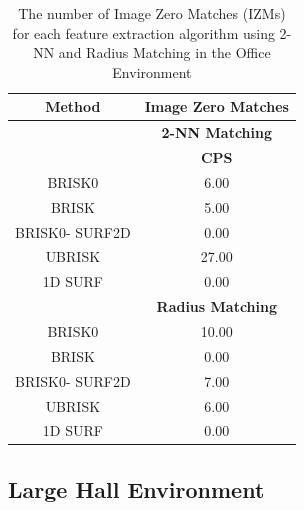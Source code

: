 \documentclass[11pt]{report}
\begin{document}
\begin{table}
\caption{The number of Image Zero Matches (IZMs) for each feature extraction
algorithm using 2-NN and Radius Matching in the Office Environment}
\begin{tabular}{|c|c|}
\hline 
\textbf{Method} & \multicolumn{1}{c|}{\textbf{Image Zero Matches}}\tabularnewline
\hline 
 & \multicolumn{1}{c|}{\textbf{2-NN Matching}}\tabularnewline
\hline 
 & \textbf{CPS}\tabularnewline
\hline 
\hline 
BRISK0 & 6.00\tabularnewline
\hline 
BRISK & 5.00\tabularnewline
\hline 
BRISK0- SURF2D & 0.00\tabularnewline
\hline 
UBRISK & 27.00\tabularnewline
\hline 
1D SURF & 0.00\tabularnewline
\hline 
 & \multicolumn{1}{c|}{\textbf{Radius Matching}}\tabularnewline
\hline 
BRISK0 & 10.00\tabularnewline
\hline 
BRISK & 0.00\tabularnewline
\hline 
BRISK0- SURF2D & 7.00\tabularnewline
\hline 
UBRISK & 6.00\tabularnewline
\hline 
1D SURF & 0.00\tabularnewline
\hline 
\end{tabular}
\label{app:oe_izm}
\end{table}


\subsection{Large Hall Environment}
\label{app:lh}
\end{document}
